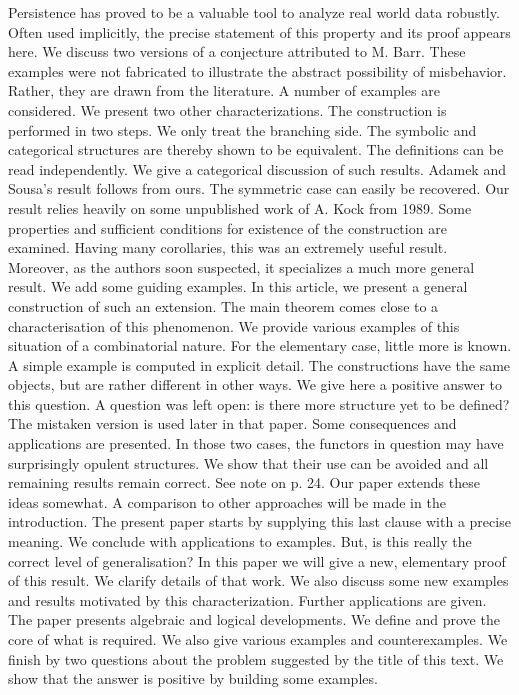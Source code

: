 Persistence has proved to be a valuable tool to analyze real world data robustly.
Often used implicitly, the precise statement of this property and its proof appears here.
We discuss two versions of a conjecture attributed to M. Barr.
These examples were not fabricated to illustrate the abstract possibility of misbehavior.
Rather, they are drawn from the literature.
A number of examples are considered.
We present two other characterizations.
The construction is performed in two steps.
We only treat the branching side.
The symbolic and categorical structures are thereby shown to be equivalent.
The definitions can be read independently.
We give a categorical discussion of such results.
Adamek and Sousa's result follows from ours.
The symmetric case can easily be recovered.
Our result relies heavily on some unpublished work of A. Kock from 1989.
Some properties and sufficient conditions for existence of the construction are examined.
Having many corollaries, this was an extremely useful result.
Moreover, as the authors soon suspected, it specializes a much more general result.
We add some guiding examples.
In this article, we present a general construction of such an extension.
The main theorem comes close to a characterisation of this phenomenon.
We provide various examples of this situation of a combinatorial nature.
For the elementary case, little more is known.
A simple example is computed in explicit detail.
The constructions have the same objects, but are rather different in other ways.
We give here a positive answer to this question.
A question was left open: is there more structure yet to be defined?
The mistaken version is used later in that paper.
Some consequences and applications are presented.
In those two cases, the functors in question may have surprisingly opulent structures. 	 		
We show that their use can be avoided and all remaining results remain correct.
See note on p. 24.
Our paper extends these ideas somewhat.
A comparison to other approaches will be made in the introduction.
The present paper starts by supplying this last clause with a precise meaning.
We conclude with applications to examples.
But, is this really the correct level of generalisation?
In this paper we will give a new, elementary proof of this result.
We clarify details of that work.
We also discuss some new examples and results motivated by this characterization.
Further applications are given.
The paper presents algebraic and logical developments. 							
We define and prove the core of what is required.
We also give various examples and counterexamples.
We finish by two questions about the problem suggested by the title of this text. 				
We show that the answer is positive by building some examples.			
